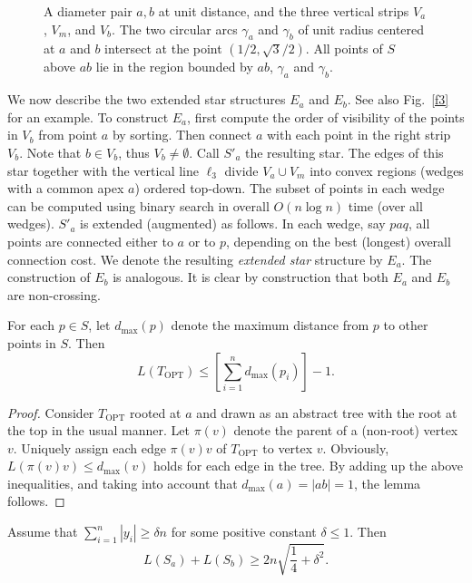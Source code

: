 \documentclass[proceedings]{stacs}
\begin{document}
\begin{figure} [htb]
\centerline{\epsfxsize=2.7in }
\caption{\small A diameter pair $a,b$ at unit distance, and the three
vertical strips $V_a$, $V_m$, and $V_b$. The two circular arcs
$\gamma_a$  and $\gamma_b$ of unit radius centered at $a$ and $b$
intersect at the point $(1/2, \sqrt{3}/2)$. All points of $S$ above
$ab$ lie in the region bounded by $ab$, $\gamma_a$  and $\gamma_b$.}
\label{f1}
\end{figure}
We now describe the two extended star structures $E_a$ and $E_b$.
See also Fig.~\ref{f3} for an example.
To construct $E_a$, first compute the order of visibility of the
points in $V_b$ from point $a$ by sorting. Then connect $a$ with each
point in the right strip $V_b$. Note that $b \in V_b$, thus $V_b \neq
\emptyset$. Call $S'_a$ the resulting star. The edges of this star together
with the vertical line $\ell_3$ divide $V_a \cup V_m$
into convex regions (wedges with a common apex $a$) ordered top-down.
The subset of points in each wedge can be computed using binary search
in overall $O(n \log{n})$ time (over all wedges).
$S'_a$ is extended (augmented) as follows.
In each wedge, say $paq$, all points are connected either to
$a$ or to $p$, depending on the best (longest) overall connection
cost. We denote the resulting {\em extended star} structure by $E_a$.
The construction of $E_b$ is analogous. It is clear by construction
that both $E_a$ and $E_b$ are non-crossing.

\begin{lemma} \label{L4}
For each $p \in S$, let $d_\textrm{max}(p)$ denote the maximum distance
from $p$ to other points in $S$. Then
$$ L(T_\textrm{OPT}) \leq \left[\sum_{i=1}^n d_\textrm{max}(p_i)\right] -1. $$
\end{lemma}
\begin{proof}
Consider $T_\textrm{OPT}$ rooted at $a$ and drawn as an abstract tree
with the root at the top in the usual manner. Let $\pi(v)$ denote the
parent of a (non-root) vertex $v$. Uniquely assign each
edge $\pi(v) v$ of $T_\textrm{OPT}$ to vertex $v$. Obviously,
$L(\pi(v) v) \leq d_\textrm{max}(v)$ holds for each edge in the tree.
By adding up the above inequalities, and taking into account that
$d_\textrm{max}(a)=|ab|=1$, the lemma follows.
\end{proof}


\begin{lemma} \label{L5}
Assume that $\sum_{i=1}^n |y_i| \geq \delta n$ for some positive constant
$\delta \leq 1$. Then
$$ L(S_a) + L(S_b) \geq 2n \sqrt{\frac{1}{4} + \delta^2}. $$
\end{lemma}
\end{document}
